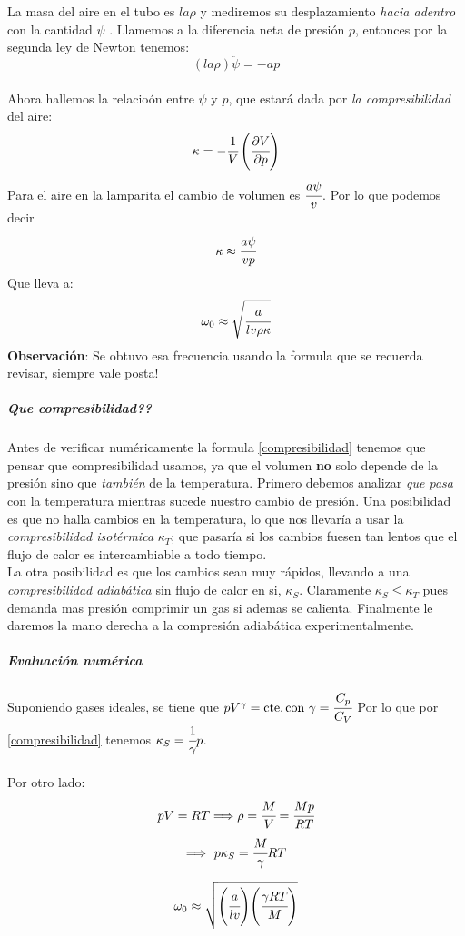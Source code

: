 \documentclass[a4paper,spanish]{article}
\numberwithin{equation}{section}
\begin{document}
La masa del aire en el tubo es $la\rho$ y mediremos su desplazamiento \textit{hacia adentro} con la cantidad $ \psi$ . Llamemos a la diferencia neta de presi\'on $p$, entonces por la segunda ley de Newton tenemos:
\[(la\rho)\ddot{\psi}=-ap\]\\
Ahora hallemos la relacio\'on entre $\psi$ y $p$, que estar\'a dada por \textit{la compresibilidad} del aire:
\begin{equation}
\kappa=-\cfrac{1}{V}\left(\cfrac{\partial V}{\partial p}\right)
\label{compresibilidad}
\end{equation}
Para el aire en la lamparita el cambio de volumen es $\cfrac{a\psi}{v}$. Por lo que podemos decir\\
\[\kappa\approx \cfrac{a\psi}{vp}\]
Que lleva a:
\begin{equation}
\omega_0\approx\sqrt{\cfrac{a}{lv\rho\kappa}}
\end{equation}
\textbf{Observaci\'on}: Se obtuvo esa frecuencia usando la formula que se recuerda revisar, siempre vale posta!
\subparagraph*{Que compresibilidad??}
Antes de verificar num\'ericamente  la formula \ref{compresibilidad} tenemos que pensar que compresibilidad usamos, ya que el volumen \textbf{no} solo depende de la presi\'on sino que \textit{tambi\'en} de la temperatura. Primero debemos analizar \textit{que pasa} con la temperatura mientras sucede nuestro cambio de presi\'on. Una posibilidad es que no halla cambios en la temperatura, lo que nos llevar\'ia a usar la \textit{compresibilidad isot\'ermica} $\kappa_T$; que pasar\'ia si los cambios fuesen tan lentos que el flujo de calor es intercambiable a todo tiempo. \\
La otra posibilidad es que los cambios sean muy r\'apidos, llevando a una \textit{compresibilidad adiab\'atica} sin flujo de calor en si, $\kappa_S$. Claramente $\kappa_S \leq\kappa_T$ pues demanda mas presi\'on comprimir un gas si ademas se calienta. Finalmente le daremos la mano derecha a la compresi\'on adiab\'atica experimentalmente.
\subparagraph*{Evaluaci\'on num\'erica}
Suponiendo gases ideales, se tiene que $pV^\gamma=\mbox{cte}, \mbox{con} \ \gamma=\cfrac{C_p}{C_V}$ Por lo que por \ref{compresibilidad} tenemos $\kappa_S=\cfrac{1}{\gamma}p$.\\\\Por otro lado:
\[pV=RT \Longrightarrow \rho=\cfrac{M}{V}=\cfrac{Mp}{RT}\]
\[\Longrightarrow\ p\kappa_S=\cfrac{M}{\gamma}RT\]

\begin{equation}
	\omega_0 \approx \sqrt{{\left(\cfrac{a}{lv}\right)}{\left(\cfrac{\gamma R T}{M}\right)}}
\end{equation}
\end{document}
